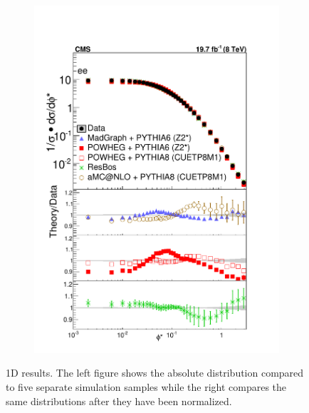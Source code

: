 \begin{figure}
\begin{subfigure}[b]{0.49\textwidth}
    \includegraphics[width=\linewidth]{figures/AppendexA/ZShape_MGAndAMC_PowHegs_elec_Norm_Born.pdf}
    \end{subfigure}
    \caption[ 1D results]{ 1D results. The left figure shows the absolute \phistar distribution compared to five separate simulation samples while the right compares the same distributions after they have been normalized.}
    \label{fig:Unfoldedee1DResults}
\end{figure}



